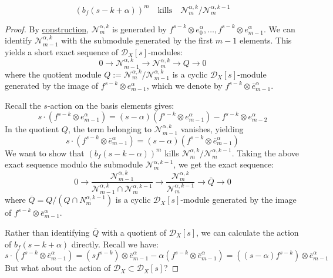 \begin{lemma} \label{lemma 10.7}
    $$
        (b_f(s-k+\alpha))^m \quad\mathrm{kills}\quad \mathcal{N}_m^{\alpha,k}\big/\mathcal{N}_m^{\alpha,k-1}
    $$
\end{lemma}
\begin{proof}
    By \hyperref[construction_of_direct_system_of_N_m_alpha_k]{construction}, $\mathcal{N}_m^{\alpha,k}$ is generated by $f^{s-k} \otimes e_0^\alpha, \dots, f^{s-k} \otimes e_{m-1}^\alpha$.
    We can identify $\mathcal{N}_{m-1}^{\alpha,k}$ with the submodule generated by the first $m-1$ elements.
    This yields a short exact sequence of $\mathcal{D}_X[s]$-modules:
    $$
        0\longrightarrow \mathcal{N}_{m-1}^{\alpha,k} \longrightarrow \mathcal{N}_m^{\alpha,k} \longrightarrow Q \longrightarrow 0
    $$
    where the quotient module $Q := \mathcal{N}_m^{\alpha,k} \big/ \mathcal{N}_{m-1}^{\alpha,k}$
    is a cyclic $\mathcal{D}_X[s]$-module generated by the image of $f^{s-k} \otimes e_{m-1}^\alpha$,
    which we denote by $f^{s-k} \otimes \overline{e}_{m-1}^{\alpha}$.

    Recall the $s$-action on the basis elements gives:
    $$
        s \cdot (f^{s-k} \otimes e^{\alpha}_{m-1}) = (s-\alpha) (f^{s-k} \otimes e^{\alpha}_{m-1}) - f^{s-k} \otimes e^{\alpha}_{m-2}
    $$
    In the quotient $Q$, the term belonging to $\mathcal{N}_{m-1}^{\alpha,k}$ vanishes, yielding
    $$
        s \cdot (f^{s-k} \otimes \overline{e}^\alpha_{m-1})=(s-\alpha)(f^{s-k} \otimes \overline{e}^\alpha_{m-1})
    $$
    We want to show that $(b_f(s-k-\alpha))^m$ kills $\mathcal{N}_m^{\alpha,k} \big/ \mathcal{N}_m^{\alpha,k-1}$.
    Taking the above exact sequence modulo the submodule $\mathcal{N}_{m}^{\alpha, k-1}$, we get the exact sequence:
    $$
        0\longrightarrow \frac{\mathcal{N}_{m-1}^{\alpha,k}}{\mathcal{N}_{m-1}^{\alpha,k} \cap \mathcal{N}_m^{\alpha,k-1}} \longrightarrow \frac{\mathcal{N}_m^{\alpha,k}}{\mathcal{N}_m^{\alpha,k-1}} \longrightarrow \overline{Q} \longrightarrow 0
    $$
    where $\overline{Q} = Q \big/ (Q \cap N_m^{\alpha,k-1})$ is a cyclic $\mathcal{D}_X[s]$-module generated by the image of $f^{s-k} \otimes \overline{e}_{m-1}^{\alpha}$.

    Rather than identifying $\overline{Q}$ with a quotient of $\mathcal{D}_X[s]$, we can calculate the action of $b_f(s-k+\alpha)$ directly.
    Recall we have:
    $$
        s \cdot (f^{s-k} \otimes \overline{e}^\alpha_{m-1}) = (s f^{s-k}) \otimes \overline{e}^\alpha_{m-1} - \alpha (f^{s-k} \otimes \overline{e}^\alpha_{m-1}) = ((s-\alpha) f^{s-k}) \otimes \overline{e}^\alpha_{m-1}
    $$
    But what about the action of $\mathcal{D}_X \subset \mathcal{D}_X[s]$?


\end{proof}
